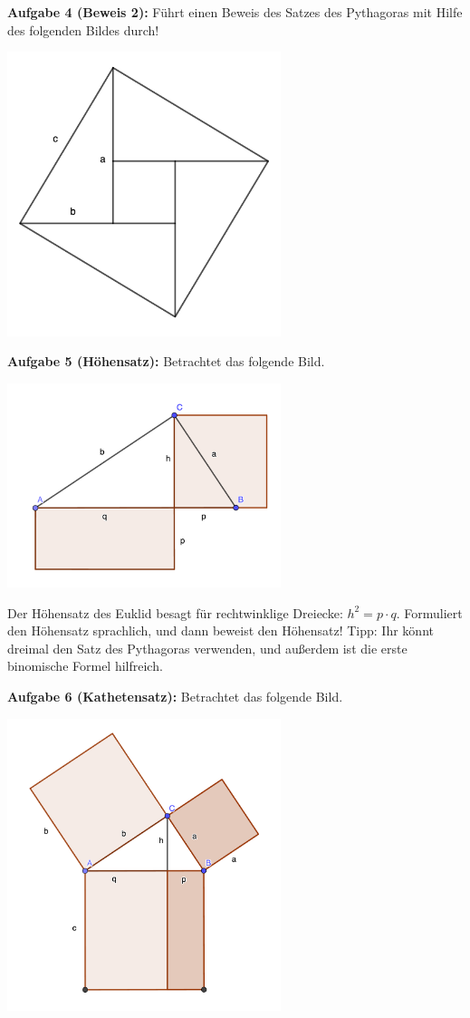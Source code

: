 \documentclass{../cssheet}
\begin{document}
\textbf{Aufgabe 4 (Beweis 2):}  Führt einen Beweis des Satzes des Pythagoras mit Hilfe des folgenden Bildes durch!
\begin{center}
\includegraphics[width=8cm]{satz-des-py-02.png}
\end{center}
\textbf{Aufgabe 5 (Höhensatz):} Betrachtet das folgende Bild.
\begin{center}
\includegraphics[width=8cm]{hoehensatz.png}
\end{center}
Der Höhensatz des Euklid besagt für rechtwinklige Dreiecke: $h^2=p\cdot q$.
Formuliert den Höhensatz sprachlich, und dann beweist den Höhensatz! Tipp: Ihr könnt dreimal den Satz des Pythagoras verwenden, und außerdem ist die erste binomische Formel hilfreich.

\textbf{Aufgabe 6 (Kathetensatz):} Betrachtet das folgende Bild.
\begin{center}
\includegraphics[width=8cm]{kathetensatz.png}
\end{center}
\end{document}
